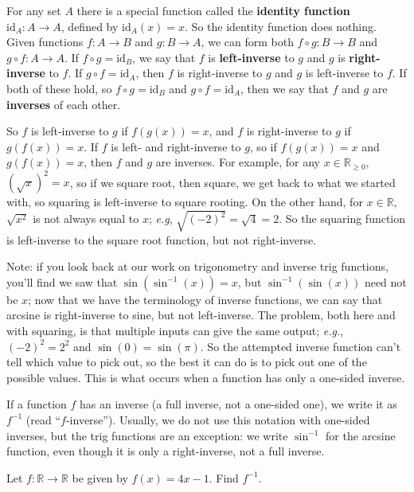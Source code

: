 \documentclass{article}
\newcommand{\id}{\mathrm{id}}
\begin{document}
\vspace{5mm}


For any set $A$ there is a special function called the \textbf{identity function} $\id_A:A\to A$, defined by $\id_A(x)=x$. So the identity function does nothing. Given functions $f:A\to B$ and $g:B\to A$, we can form both $f\circ g:B\to B$ and $g\circ f:A\to A$. If $f\circ g=\id_B$, we say that $f$ is \textbf{left-inverse} to $g$ and $g$ is \textbf{right-inverse} to $f$. If $g\circ f=\id_A$, then $f$ is right-inverse to $g$ and $g$ is left-inverse to $f$. If both of these hold, so $f\circ g=\id_B$ and $g\circ f=\id_A$, then we say that $f$ and $g$ are \textbf{inverses} of each other.


So $f$ is left-inverse to $g$ if $f(g(x))=x$, and $f$ is right-inverse to $g$ if $g(f(x))=x$. If $f$ is left- and right-inverse to $g$, so if $f(g(x))=x$ and $g(f(x))=x$, then $f$ and $g$ are inverses. For example, for any $x\in\mathbb{R}_{\geq 0}$, $\left(\sqrt{x}\right)^2=x$, so if we square root, then square, we get back to what we started with, so squaring is left-inverse to square rooting. On the other hand, for $x\in\mathbb{R}$, $\sqrt{x^2}$ is not always equal to $x$; \textit{e.g}, $\sqrt{(-2)^2}=\sqrt{4}=2$. So the squaring function is left-inverse to the square root function, but not right-inverse.


Note: if you look back at our work on trigonometry and inverse trig functions, you'll find we saw that $\sin(\sin^{-1}(x))=x$, but $\sin^{-1}(\sin(x))$ need not be $x$; now that we have the terminology of inverse functions, we can say that arcsine is right-inverse to sine, but not left-inverse. The problem, both here and with squaring, is that multiple inputs can give the same output; \textit{e.g.}, $(-2)^2=2^2$ and $\sin(0)=\sin(\pi)$. So the attempted inverse function can't tell which value to pick out, so the best it can do is to pick out one of the possible values. This is what occurs when a function has only a one-sided inverse.

If a function $f$ has an inverse (a full inverse, not a one-sided one), we write it as $f^{-1}$ (read ``$f$-inverse''). Usually, we do not use this notation with one-sided inverses, but the trig functions are an exception: we write $\sin^{-1}$ for the arcsine function, even though it is only a right-inverse, not a full inverse.\bigskip





Let $f:\mathbb{R}\to\mathbb{R}$ be given by $f(x)=4x-1$. Find $f^{-1}$.
\end{document}
